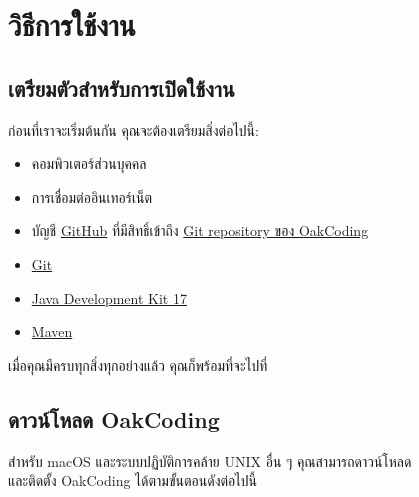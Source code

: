 \section{วิธีการใช้งาน}\label{sec:usage}

\setlength{\baselineskip}{1ex}



\subsection{เตรียมตัวสำหรับการเปิดใช้งาน}\label{subsec:prep-install}

ก่อนที่เราจะเริ่มต้นกัน คุณจะต้องเตรียมสิ่งต่อไปนี้:

\begin{itemize}
    \item คอมพิวเตอร์ส่วนบุคคล
    \item การเชื่อมต่ออินเทอร์เน็ต
    \item บัญชี \href{https://github.com/}{GitHub} ที่มีสิทธิ์เข้าถึง \href{https://github.com/CS211-651/project211-oakcoding.git}{Git repository ของ OakCoding}
    \item \href{https://git-scm.com/}{Git}
    \item \href{https://openjdk.org/}{Java Development Kit 17}
    \item \href{https://maven.apache.org/}{Maven}
\end{itemize}

เมื่อคุณมีครบทุกสิ่งทุกอย่างแล้ว คุณก็พร้อมที่จะไปที่ 

\pagebreak[4]

\subsection{ดาวน์โหลด OakCoding}\label{subsec:install}


สำหรับ macOS และระบบปฏิบัติการคล้าย UNIX อื่น ๆ คุณสามารถดาวน์โหลด\\
\mbox{และติดตั้ง} OakCoding ได้ตามขั้นตอนดังต่อไปนี้

